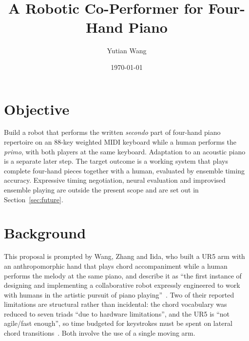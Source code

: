 \documentclass[11pt]{article}
\title{\vspace{-1.6em}\textbf{A Robotic Co-Performer for Four-Hand Piano}\vspace{-0.4em}}
\author{Yutian Wang}
\date{\vspace{-0.7em}\small\today\vspace{-1.2em}}
\begin{document}
\maketitle

\section*{Objective}
Build a robot that performs the written \emph{secondo} part of four-hand piano repertoire on an
88-key weighted MIDI keyboard while a human performs the \emph{primo}, with both players at the same
keyboard. Adaptation to an acoustic piano is a separate later step. The target outcome is a working system that plays complete four-hand pieces together with a
human, evaluated by ensemble timing accuracy. Expressive timing negotiation, neural evaluation and
improvised ensemble playing are outside the present scope and are set out in
Section~\ref{sec:future}.

\section{Background}
This proposal is prompted by Wang, Zhang and Iida, who built a UR5 arm with an anthropomorphic hand
that plays chord accompaniment while a human performs the melody at the same piano, and describe it
as ``the first instance of designing and implementing a collaborative robot expressly engineered to
work with humans in the artistic pursuit of piano playing''~\cite{wang2024cooperative}. Two of their
reported limitations are structural rather than incidental: the chord vocabulary was reduced to seven
triads ``due to hardware limitations'', and the UR5 is ``not agile/fast enough'', so time budgeted
for keystrokes must be spent on lateral chord transitions~\cite{wang2024cooperative}. Both involve
the use of a single moving arm.
\end{document}
